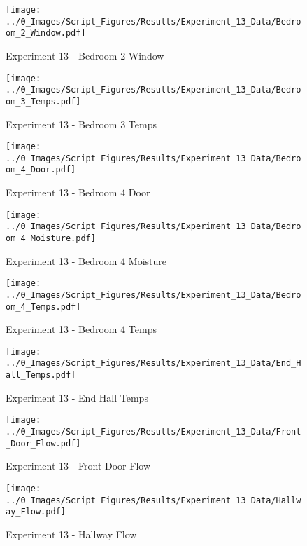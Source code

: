 	\clearpage

	\begin{figure}[H]
		\centering
		\texttt{[image: ../0\_Images/Script\_Figures/Results/Experiment\_13\_Data/Bedroom\_2\_Window.pdf]}
		\caption[]{Experiment 13 - Bedroom 2 Window}
	\end{figure}
 

	\begin{figure}[H]
		\centering
		\texttt{[image: ../0\_Images/Script\_Figures/Results/Experiment\_13\_Data/Bedroom\_3\_Temps.pdf]}
		\caption[]{Experiment 13 - Bedroom 3 Temps}
	\end{figure}
 
	\clearpage

	\begin{figure}[H]
		\centering
		\texttt{[image: ../0\_Images/Script\_Figures/Results/Experiment\_13\_Data/Bedroom\_4\_Door.pdf]}
		\caption[]{Experiment 13 - Bedroom 4 Door}
	\end{figure}
 

	\begin{figure}[H]
		\centering
		\texttt{[image: ../0\_Images/Script\_Figures/Results/Experiment\_13\_Data/Bedroom\_4\_Moisture.pdf]}
		\caption[]{Experiment 13 - Bedroom 4 Moisture}
	\end{figure}
 
	\clearpage

	\begin{figure}[H]
		\centering
		\texttt{[image: ../0\_Images/Script\_Figures/Results/Experiment\_13\_Data/Bedroom\_4\_Temps.pdf]}
		\caption[]{Experiment 13 - Bedroom 4 Temps}
	\end{figure}
 

	\begin{figure}[H]
		\centering
		\texttt{[image: ../0\_Images/Script\_Figures/Results/Experiment\_13\_Data/End\_Hall\_Temps.pdf]}
		\caption[]{Experiment 13 - End Hall Temps}
	\end{figure}
 
	\clearpage

	\begin{figure}[H]
		\centering
		\texttt{[image: ../0\_Images/Script\_Figures/Results/Experiment\_13\_Data/Front\_Door\_Flow.pdf]}
		\caption[]{Experiment 13 - Front Door Flow}
	\end{figure}
 

	\begin{figure}[H]
		\centering
		\texttt{[image: ../0\_Images/Script\_Figures/Results/Experiment\_13\_Data/Hallway\_Flow.pdf]}
		\caption[]{Experiment 13 - Hallway Flow}
	\end{figure}
 
